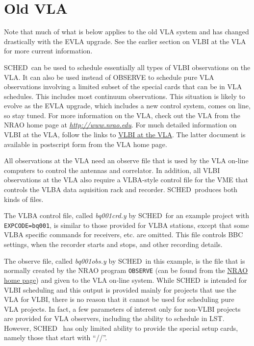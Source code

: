 \documentclass{report}
\newcommand{\schedb}{{\sc SCHED~}}
\begin{document}
\section{\label{SEC:OLDVLA}Old VLA}

Note that much of what is below applies to the old VLA system and 
has changed drastically with the EVLA upgrade. See the
earlier section on VLBI at the VLA for more current information.

\schedb can be used to schedule essentially all types of VLBI
observations on the VLA.  It can also be used instead of {\sc OBSERVE}
to schedule pure VLA observations involving a limited subset of the
special cards that can be in VLA schedules.  This includes most
continuum observations.  This situation is likely to evolve as the EVLA
upgrade, which includes a new control system, comes on line, so stay
tuned.  For more information on the VLA, check out
the VLA from the NRAO home page at 
{\href{http://www.nrao.edu}{{\sl http://www.nrao.edu}}}.
For much detailed
information on VLBI at the VLA, follow the links to
{\href{http://www.vla.nrao.edu/astro/guides/vlbivla/current/}{VLBI at the VLA}}.
The latter document is available in postscript form
from the VLA home page.

All observations at the VLA need an observe file that is used by the
VLA on-line computers to control the antennas and correlator.  In
addition, all VLBI observations at the VLA also require a VLBA-style
control file for the VME that controls the VLBA data aquisition rack
and recorder.  \schedb produces both kinds of files.

The VLBA control file, called {\sl bq001crd.y} by \schedb for an
example project with {\tt EXPCODE=bq001}, is similar to those provided
for VLBA stations, except that some VLBA specific commands for
receivers, etc. are omitted. This file controls BBC settings, when the
recorder starts and stops, and other recording details.

The observe file, called {\sl bq001obs.y} by \schedb in this example,
is the file that is normally created by the NRAO program {\tt OBSERVE}
(can be found from the 
{\href{http://www.nrao.edu}{NRAO home page}})
and given to the VLA on-line system. While
\schedb is intended for VLBI scheduling and this output is provided
mainly for projects that use the VLA for VLBI, there is no reason that
it cannot be used for scheduling pure VLA projects. In fact, a few
parameters of interest only for non-VLBI projects are provided for VLA
observers, including the ability to schedule in LST. However, \schedb
has only limited ability to provide the special setup cards, namely
those that start with ``//''.
\end{document}
